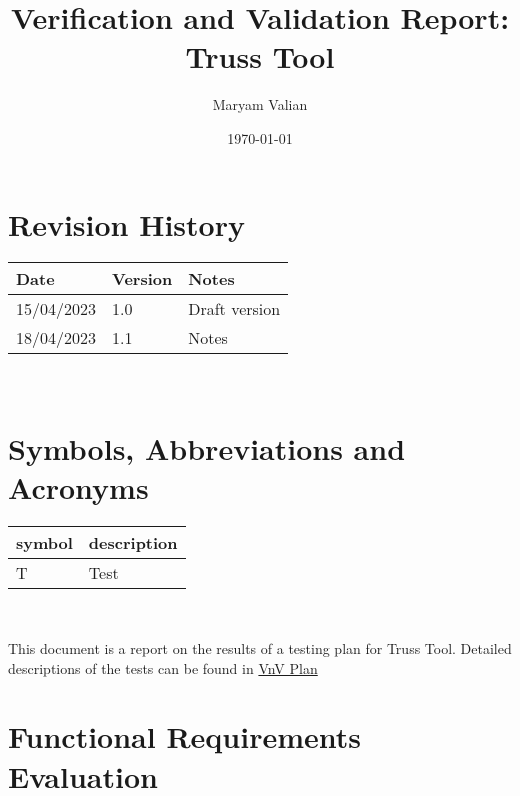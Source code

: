 \documentclass[12pt, titlepage]{article}
\begin{document}
\title{Verification and Validation Report: Truss Tool} 
\author{Maryam Valian}
\date{\today}
	
\maketitle


\section{Revision History}

\begin{tabularx}{\textwidth}{p{3cm}p{2cm}X}
\toprule {\bf Date} & {\bf Version} & {\bf Notes}\\
\midrule
15/04/2023 & 1.0 & Draft version\\
18/04/2023 & 1.1 & Notes\\
\bottomrule
\end{tabularx}

~\newpage

\section{Symbols, Abbreviations and Acronyms}

\renewcommand{\arraystretch}{1.2}
\begin{tabular}{l l} 
  \toprule		
  \textbf{symbol} & \textbf{description}\\
  \midrule 
  T & Test\\
  \bottomrule
\end{tabular}\\


\newpage

\tableofcontents

\listoftables %

\listoffigures %

\newpage


This document is a report on the results of a testing plan for Truss Tool.
Detailed descriptions of the tests can be found in \href{https://github.com/Maryamvalian/project741/blob/cfe06182f41c842e3b44aa0eb33d661cf8a3ce79/docs/VnVPlan/VnVPlan.pdf}{VnV Plan}

\section{Functional Requirements Evaluation}
\end{document}
